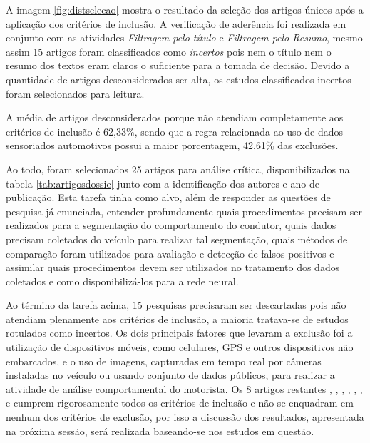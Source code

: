 \documentclass[10pt,journal,compsoc]{IEEEtran}
\begin{document}
A imagem \ref{fig:distselecao} mostra o resultado da seleção dos
artigos únicos após a aplicação dos critérios de inclusão. A
verificação de aderência foi realizada em
conjunto com as atividades \emph{Filtragem pelo título} e
\emph{Filtragem pelo Resumo}, mesmo assim 15 artigos foram
classificados como \emph{incertos} pois nem o título nem o resumo dos textos eram
claros o suficiente para a tomada de decisão. Devido a quantidade de
artigos desconsiderados ser alta, os estudos classificados incertos foram selecionados para
leitura.

A média de artigos desconsiderados porque não atendiam completamente aos critérios de
inclusão é 62,33\%, sendo que a regra relacionada ao uso de dados
sensoriados automotivos possui a maior porcentagem, 42,61\% das
exclusões.

Ao todo, foram selecionados 25 artigos para análise crítica,
disponibilizados na tabela \ref{tab:artigosdossie} junto com a
identificação dos autores e ano de publicação. Esta tarefa tinha como
alvo, além de responder as questões de pesquisa já enunciada, entender
profundamente quais procedimentos precisam ser realizados para a
segmentação do comportamento do condutor, quais dados precisam coletados do
veículo para realizar tal segmentação, quais métodos de comparação foram
utilizados para avaliação e detecção de falsos-positivos e assimilar quais procedimentos devem ser utilizados no
tratamento dos dados coletados e como disponibilizá-los para a rede neural.

Ao término da tarefa acima, 15 pesquisas precisaram ser descartadas
pois não atendiam plenamente aos critérios de inclusão, a maioria
tratava-se de estudos rotulados como incertos. Os dois principais
fatores que levaram a exclusão foi a utilização de dispositivos
móveis, como celulares, GPS e outros dispositivos não embarcados, e o uso de imagens, capturadas em tempo real por câmeras
instaladas no veículo ou usando conjunto de dados públicos, para realizar a
atividade de análise comportamental do motorista. Os 8 artigos
restantes \cite{Lee2017}, \cite{Liang2014146}, \cite{Kagawa2017},
\cite{Liu2018}, \cite{Liu20151054}, \cite{Liu2016},
\cite{Liu20172477} e \cite{Liu20141427} cumprem
rigorosamente todos os critérios de inclusão e não se enquadram em
nenhum dos critérios de exclusão, por isso a discussão dos resultados,
apresentada na próxima sessão, será realizada baseando-se nos estudos
em questão.
\end{document}
